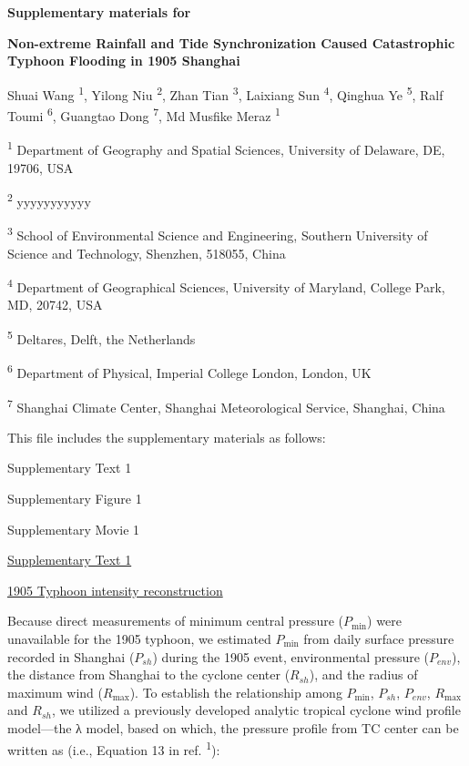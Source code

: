 \documentclass[
]{article}
\author{}
\date{}
\begin{document}
\textbf{Supplementary materials for}

\textbf{Non-extreme Rainfall and Tide Synchronization Caused
Catastrophic Typhoon Flooding in 1905 Shanghai}

Shuai Wang \textsuperscript{1}, Yilong Niu \textsuperscript{2}, Zhan
Tian \textsuperscript{3}, Laixiang Sun \textsuperscript{4}, Qinghua Ye
\textsuperscript{5}, Ralf Toumi \textsuperscript{6}, Guangtao Dong
\textsuperscript{7}, Md Musfike Meraz \textsuperscript{1}

\textsuperscript{1} Department of Geography and Spatial Sciences,
University of Delaware, DE, 19706, USA

\textsuperscript{2} yyyyyyyyyyy

\textsuperscript{3} School of Environmental Science and Engineering,
Southern University of Science and Technology, Shenzhen, 518055, China

\textsuperscript{4} Department of Geographical Sciences, University of
Maryland, College Park, MD, 20742, USA

\textsuperscript{5} Deltares, Delft, the Netherlands

\textsuperscript{6} Department of Physical, Imperial College London,
London, UK

\textsuperscript{7} Shanghai Climate Center, Shanghai Meteorological
Service, Shanghai, China

This file includes the supplementary materials as follows:

Supplementary Text 1

Supplementary Figure 1

Supplementary Movie 1

\ul{Supplementary Text 1}

\ul{1905 Typhoon intensity reconstruction}

Because direct measurements of minimum central pressure (\(P_{\min}\))
were unavailable for the 1905 typhoon, we estimated \(P_{\min}\) from
daily surface pressure recorded in Shanghai (\(P_{sh}\)) during the 1905
event, environmental pressure (\(P_{env}\)), the distance from Shanghai
to the cyclone center (\(R_{sh}\)), and the radius of maximum wind
(\(R_{\max}\)). To establish the relationship among \(P_{\min}\),
\(P_{sh}\), \(P_{env}\), \(R_{\max}\) and \(R_{sh}\), we utilized a
previously developed analytic tropical cyclone wind profile model---the
λ model, based on which, the pressure profile from TC center can be
written as (i.e., Equation 13 in ref. \textsuperscript{1}):
\end{document}
